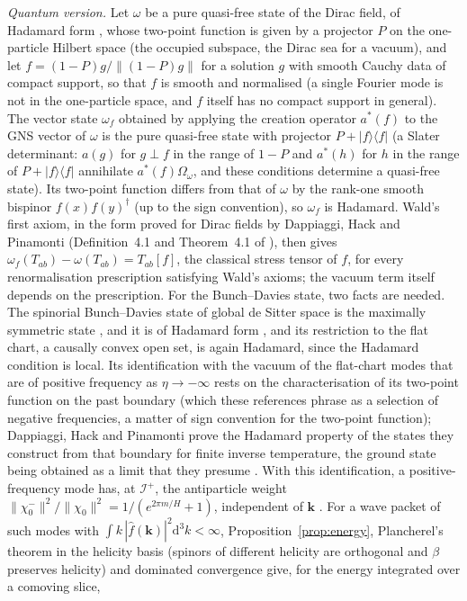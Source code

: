 \documentclass[11pt,a4paper]{article}
\theoremstyle{definition}
\newcommand{\scri}{\mathscr{I}^{+}}
\newcommand{\dd}{\mathrm{d}}
\begin{document}
\emph{Quantum version.} Let $\omega$ be a pure quasi-free state of the Dirac field, of Hadamard form \cite{Hollands2001,DHP2009}, whose two-point function is given by a projector $P$ on the one-particle Hilbert space (the occupied subspace, the Dirac sea for a vacuum), and let $f=(1-P)g/\|(1-P)g\|$ for a solution $g$ with smooth Cauchy data of compact support, so that $f$ is smooth and normalised (a single Fourier mode is not in the one-particle space, and $f$ itself has no compact support in general). The vector state $\omega_{f}$ obtained by applying the creation operator $a^{*}(f)$ to the GNS vector of $\omega$ is the pure quasi-free state with projector $P+|f\rangle\langle f|$ (a Slater determinant: $a(g)$ for $g\perp f$ in the range of $1-P$ and $a^{*}(h)$ for $h$ in the range of $P+|f\rangle\langle f|$ annihilate $a^{*}(f)\Omega_{\omega}$, and these conditions determine a quasi-free state). Its two-point function differs from that of $\omega$ by the rank-one smooth bispinor $f(x)f(y)^{\dagger}$ (up to the sign convention), so $\omega_{f}$ is Hadamard. Wald's first axiom, in the form proved for Dirac fields by Dappiaggi, Hack and Pinamonti (Definition~4.1 and Theorem~4.1 of \cite{DHP2009}), then gives $\omega_{f}(T_{ab})-\omega(T_{ab})=T_{ab}[f]$, the classical stress tensor of $f$, for every renormalisation prescription satisfying Wald's axioms; the vacuum term itself depends on the prescription. For the Bunch--Davies state, two facts are needed. The spinorial Bunch--Davies state of global de Sitter space is the maximally symmetric state \cite{AllenLutken1986}, and it is of Hadamard form \cite[Proposition~4.5]{DFMR2019}, and its restriction to the flat chart, a causally convex open set, is again Hadamard, since the Hadamard condition is local. Its identification with the vacuum of the flat-chart modes that are of positive frequency as $\eta\to-\infty$ rests on the characterisation of its two-point function on the past boundary \cite{DFMR2019,DHP2010} (which these references phrase as a selection of negative frequencies, a matter of sign convention for the two-point function); Dappiaggi, Hack and Pinamonti prove the Hadamard property of the states they construct from that boundary for finite inverse temperature, the ground state being obtained as a limit that they presume \cite{DHP2010}. With this identification, a positive-frequency mode has, at $\scri$, the antiparticle weight $\|\chi_{0}^{-}\|^{2}/\|\chi_{0}\|^{2}=1/(e^{2\pi m/H}+1)$, independent of $\mathbf{k}$ \cite{Boonpan2026}. For a wave packet of such modes with $\int k\,|\hat f(\mathbf{k})|^{2}\dd^{3}k<\infty$, Proposition~\ref{prop:energy}, Plancherel's theorem in the helicity basis (spinors of different helicity are orthogonal and $\beta$ preserves helicity) and dominated convergence give, for the energy integrated over a comoving slice,
\end{document}

